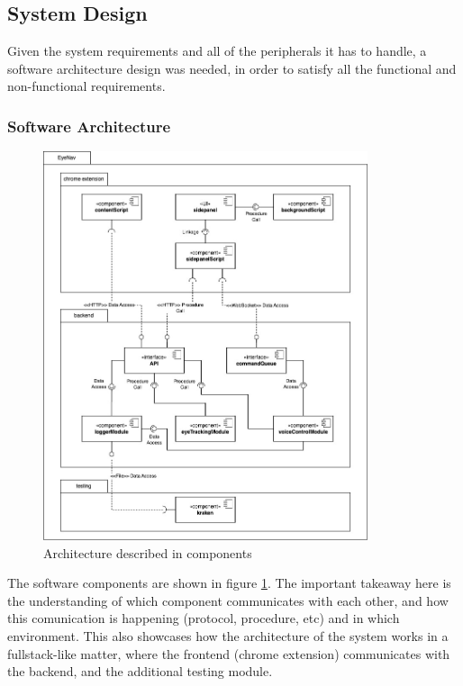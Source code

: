 \subsection{System Design}

Given the system requirements and all of the peripherals it has to handle, a software architecture design was needed, in order to satisfy all the functional and non-functional requirements.

\subsubsection{Software Architecture}

\begin{figure}[ht]
    \centering
    \includegraphics[width=0.85\textwidth]{images/components-diagram.jpg}
    \caption{Architecture described in components}
    \label{fig:components-diagram}
\end{figure}

The software components are shown in figure \ref{fig:components-diagram}. The important takeaway here is the understanding of which component communicates with each other, and how this comunication is happening (protocol, procedure, etc) and in which environment. This also showcases how the architecture of the system works in a fullstack-like matter, where the frontend (chrome extension) communicates with the backend, and the additional testing module. 

